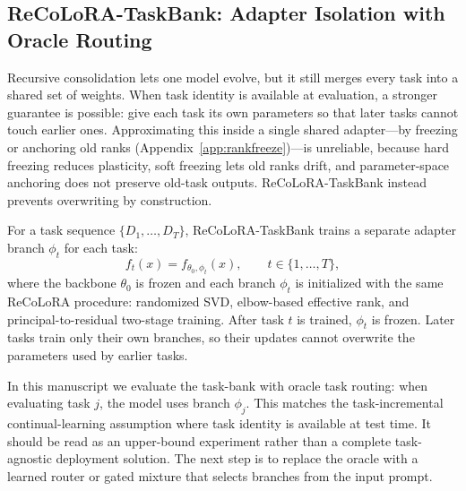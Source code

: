 \documentclass[11pt]{article}
\begin{document}
\subsection{ReCoLoRA-TaskBank: Adapter Isolation with Oracle Routing}
Recursive consolidation lets one model evolve, but it still merges every task into a shared set of weights. When task identity is available at evaluation, a stronger guarantee is possible: give each task its own parameters so that later tasks cannot touch earlier ones. Approximating this inside a single shared adapter---by freezing or anchoring old ranks (Appendix~\ref{app:rankfreeze})---is unreliable, because hard freezing reduces plasticity, soft freezing lets old ranks drift, and parameter-space anchoring does not preserve old-task outputs. ReCoLoRA-TaskBank instead prevents overwriting by construction.

For a task sequence $\{D_1,\ldots,D_T\}$, ReCoLoRA-TaskBank trains a separate adapter branch $\phi_t$ for each task:
\begin{equation}
    f_t(x) = f_{\theta_0,\phi_t}(x), \qquad t\in\{1,\ldots,T\},
\end{equation}
where the backbone $\theta_0$ is frozen and each branch $\phi_t$ is initialized with the same ReCoLoRA procedure: randomized SVD, elbow-based effective rank, and principal-to-residual two-stage training. After task $t$ is trained, $\phi_t$ is frozen. Later tasks train only their own branches, so their updates cannot overwrite the parameters used by earlier tasks.

In this manuscript we evaluate the task-bank with oracle task routing: when evaluating task $j$, the model uses branch $\phi_j$. This matches the task-incremental continual-learning assumption where task identity is available at test time. It should be read as an upper-bound experiment rather than a complete task-agnostic deployment solution. The next step is to replace the oracle with a learned router or gated mixture that selects branches from the input prompt.
\end{document}
